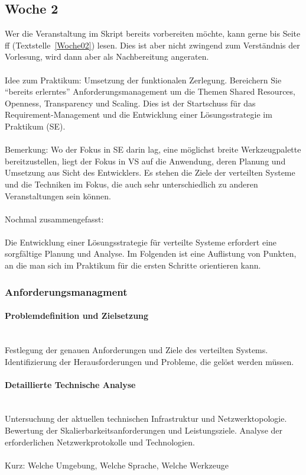 \subsection{Woche 2}
Wer die Veranstaltung im Skript bereits vorbereiten möchte, kann gerne bis Seite \pageref{Woche02}ff (Textstelle~\ref{Woche02}) lesen. Dies ist aber nicht zwingend zum Verständnis der Vorlesung, wird dann aber als Nachbereitung angeraten.
\\\\
Idee zum Praktikum: Umsetzung der funktionalen Zerlegung. Bereichern Sie \enquote{bereits erlerntes} Anforderungsmanagement um die Themen Shared Resources, Openness, Transparency und Scaling. Dies ist der Startschuss für das Requirement-Management und die Entwicklung einer Lösungsstrategie im Praktikum (SE). 
\\\\
Bemerkung: Wo der Fokus in SE darin lag, eine möglichst breite Werkzeugpalette bereitzustellen, liegt der Fokus in VS auf die Anwendung, deren Planung und Umsetzung aus Sicht des Entwicklers. Es stehen die Ziele der verteilten Systeme und die Techniken im Fokus, die auch sehr unterschiedlich zu anderen Veranstaltungen sein können.  \\\\
Nochmal zusammengefasst:
\\\\
Die Entwicklung einer Lösungsstrategie für verteilte Systeme erfordert eine sorgfältige Planung und Analyse. Im Folgenden ist eine Auflistung von Punkten, an die man sich im Praktikum für die ersten Schritte orientieren kann. 

\subsubsection{Anforderungsmanagment} 

\paragraph{Problemdefinition und Zielsetzung}
\mbox{}\\
Festlegung der genauen Anforderungen und Ziele des verteilten Systems.
Identifizierung der Herausforderungen und Probleme, die gelöst werden müssen.

\paragraph{Detaillierte Technische Analyse}
\mbox{}\\
Untersuchung der aktuellen technischen Infrastruktur und Netzwerktopologie.	Bewertung der Skalierbarkeitsanforderungen und Leistungsziele. Analyse der erforderlichen Netzwerkprotokolle und Technologien.
\\\\	
Kurz: Welche Umgebung, Welche Sprache, Welche Werkzeuge
